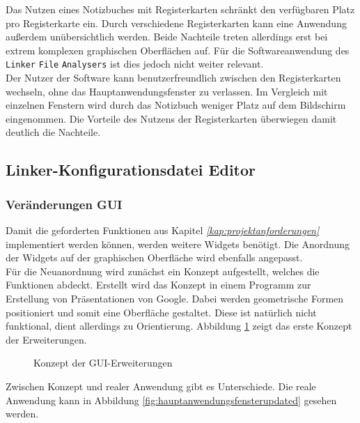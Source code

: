 Das Nutzen eines Notizbuches mit Registerkarten schränkt den verfügbaren Platz pro Registerkarte ein.
Durch verschiedene Registerkarten kann eine Anwendung außerdem unübersichtlich werden.
Beide Nachteile treten allerdings erst bei extrem komplexen graphischen Oberflächen auf.
Für die Softwareanwendung des \verb*|Linker| \verb*|File| \verb*|Analysers| ist dies jedoch nicht weiter relevant. \\

Der Nutzer der Software kann benutzerfreundlich zwischen den Registerkarten wechseln, ohne das Hauptanwendungsfenster zu verlassen.
Im Vergleich mit einzelnen Fenstern wird durch das Notizbuch weniger Platz auf dem Bildschirm eingenommen.
Die Vorteile des Nutzens der Registerkarten überwiegen damit deutlich die Nachteile. \\

\subsection{Linker-Konfigurationsdatei Editor}\label{kap:linker_konfig_editor}

\subsubsection{Veränderungen GUI}\label{kap:veränderungen_gui}
Damit die geforderten Funktionen aus Kapitel \textit{\ref{kap:projektanforderungen}  }implementiert werden können, werden weitere Widgets benötigt.
Die Anordnung der Widgets auf der graphischen Oberfläche wird ebenfalls angepasst.\\

Für die Neuanordnung wird zunächst ein Konzept aufgestellt, welches die Funktionen abdeckt.
Erstellt wird das Konzept in einem Programm zur Erstellung von Präsentationen von Google.
Dabei werden geometrische Formen positioniert und somit eine Oberfläche gestaltet.
Diese ist natürlich nicht funktional, dient allerdings zu Orientierung.
Abbildung \ref{fig:konzept} zeigt das erste Konzept der Erweiterungen.\\

\begin{figure}[H]
	\centering
	\caption{Konzept der GUI-Erweiterungen}
	\label{fig:konzept}
\end{figure}

Zwischen Konzept und realer Anwendung gibt es Unterschiede.
Die reale Anwendung kann in Abbildung \ref{fig:hauptanwendungsfensterupdated} gesehen werden.\\

